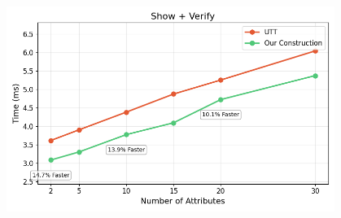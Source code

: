 \begin{figure}[!htbp]
    \centering
    \begin{minipage}{\textwidth}
        \centering
        \includegraphics[width=0.95\textwidth]{figures/chap2_show_verify_utt_vs_us.png}
    \end{minipage}

    \vspace{0.05cm}
    

\end{figure}
